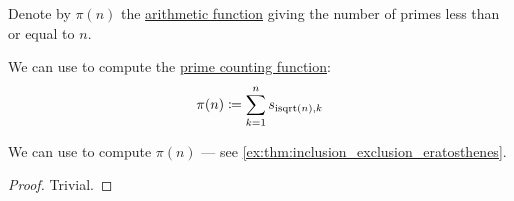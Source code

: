 \begin{definition}\label{def:prime_counting_function}
  Denote by \( \pi(n) \) the \hyperref[def:arithmetic_function]{arithmetic function} giving the number of primes less than or equal to \( n \).
\end{definition}

\begin{proposition}\label{thm:prime_counting_sieve}
  We can use  to compute the \hyperref[def:prime_counting_function]{prime counting function}:
  \begin{equation*}
    \pi(n) \coloneqq \sum_{k=1}^n s_{\op{isqrt}(n),k}
  \end{equation*}
\end{proposition}
\begin{comments}
  \item We can use  to compute \( \pi(n) \) --- see \cref{ex:thm:inclusion_exclusion_eratosthenes}.
\end{comments}
\begin{proof}
  Trivial.
\end{proof}

